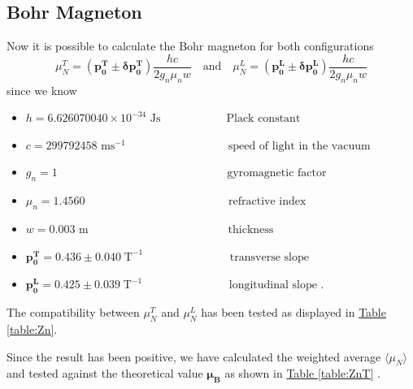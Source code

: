 \documentclass[a4paper,12pt,abstracton]{scrartcl}
\begin{document}
\clearpage

\subsection{Bohr Magneton}
Now it is possible to calculate the Bohr magneton for both configurations $$\mu_N^T= (\boldsymbol{p_0^T}\pm \boldsymbol{\delta p_0^T})\frac{hc}{2g_n\mu_n w} \quad\text{and}\quad \mu_N^L= (\boldsymbol{p_0^L}\pm \boldsymbol{\delta p_0^L})\frac{hc}{2g_n\mu_n w}$$ 
 since we know 
\begin{itemize}
\item $h=6.626070040\times10^{-34} \text{ Js}  \;\,\quad\qquad\qquad\text{ Plack constant}$  
\item $c=299792458 \text{ ms}^{-1}  \quad\qquad\qquad\qquad\qquad\text{speed of light in the vacuum}$
\item $g_n=1   \;\;\qquad\qquad\qquad\qquad\qquad\qquad\qquad\text{ gyromagnetic factor}$
\item $\mu_n= 1.4560    \;\qquad\qquad\qquad\qquad\qquad\qquad\text{ refractive index}$
\item  $w= 0.003 \text{ m} \;\qquad\qquad\qquad\qquad\qquad\qquad\text{thickness}$
\item $\boldsymbol{p_0^{T}}=0.436 \pm 0.040 \;\text{T}^{-1} \;\quad\qquad\qquad\qquad\text{ transverse slope}$
\item $\boldsymbol{p_0^{L}}=0.425 \pm 0.039 \;\text{T}^{-1} \;\quad\qquad\qquad\qquad\text{ longitudinal slope .}$\newline
\end{itemize}
The compatibility between $\mu_N^T$ and $\mu_N^L$ has been tested as displayed in \hyperref[table:Zn]{Table \ref*{table:Zn}}. 
\begin{table}[H]
\caption{}
\centering
{}
\label{table:Zn}
\end{table}

Since the result has been positive, we have calculated the weighted average $ \langle \mu_N\rangle$ and tested against the theoretical value $\boldsymbol{\mu_B}$ as shown in \hyperref[table:ZnT]{Table \ref*{table:ZnT}} .
\end{document}
